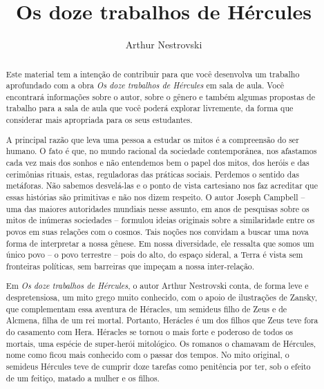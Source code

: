 \documentclass[11pt]{extarticle}
\newcommand{\AutorLivro}{Arthur Nestrovski}
\newcommand{\TituloLivro}{Os doze trabalhos de Hércules}
\newcommand{\colaborador}{Gabriela Karam}
\begin{document}
\title{\TituloLivro}
\author{\AutorLivro}
\def\authornotes{\colaborador}

\date{}
\maketitle


\tableofcontents


\begin{abstract}
Este material tem a intenção de contribuir para que você desenvolva um trabalho aprofundado com a obra \textit{Os doze trabalhos de Hércules} em sala de aula. Você encontrará informações sobre o autor, sobre o gênero e também algumas propostas de trabalho para a sala de aula que você poderá explorar livremente, da forma que considerar mais apropriada para os seus estudantes. 

A principal razão que leva uma pessoa a estudar os mitos é a compreensão do ser humano. O fato é que, no mundo racional da sociedade contemporânea, nos afastamos cada vez mais dos sonhos e não entendemos bem o papel dos mitos, dos heróis e das cerimônias rituais, estas, reguladoras das práticas sociais. Perdemos o sentido das metáforas. Não sabemos desvelá-las e o ponto de vista cartesiano nos faz acreditar que essas histórias são primitivas e não nos dizem respeito. O autor Joseph Campbell -- uma das maiores autoridades mundiais nesse assunto, em anos de pesquisas sobre os mitos de inúmeras sociedades -- formulou ideias originais sobre a similaridade entre os povos em suas relações com o cosmos. Tais noções nos convidam a buscar uma nova forma de interpretar a nossa gênese. Em nossa diversidade, ele ressalta que somos um único povo – o povo terrestre – pois do alto, do espaço sideral, a Terra é vista sem fronteiras políticas, sem barreiras que impeçam a nossa inter-relação. 

Em \textit{Os doze trabalhos de Hércules}, o autor Arthur Nestrovski conta, de forma leve e despretensiosa, um mito grego muito conhecido, com o apoio de ilustrações de Zansky, que complementam essa aventura de Héracles, um semideus filho de Zeus e de Alcmena, filha de um rei mortal. Portanto, Herácles é um dos filhos que Zeus teve fora do casamento com Hera. Héracles se tornou o mais forte e poderoso de todos os mortais, uma espécie de super-herói mitológico. Os romanos o chamavam de Hércules, nome como ficou mais conhecido com o passar dos tempos. No mito original, o semideus Hércules teve de cumprir doze tarefas como penitência por ter, sob o efeito de um feitiço, matado a mulher e os filhos. 


\end{abstract}
\end{document}
